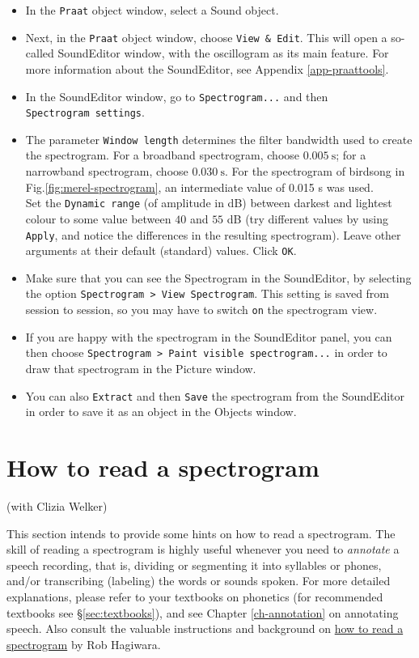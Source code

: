 \documentclass[
]{book}
\begin{document}
\begin{itemize}
\item
  In the \texttt{Praat} object window, select a Sound object.
\item
  Next, in the \texttt{Praat} object window, choose \texttt{View\ \&\ Edit}. This will open a so-called SoundEditor window, with the oscillogram as its main feature. For more information about the SoundEditor, see Appendix \ref{app-praattools}.
\item
  In the SoundEditor window, go to \texttt{Spectrogram...} and then \texttt{Spectrogram\ settings}.
\item
  The parameter \texttt{Window\ length} determines the filter bandwidth used to create the spectrogram. For a broadband spectrogram, choose \(0.005\ \textrm{s}\); for a narrowband spectrogram, choose \(0.030\ \textrm{s}\).
  For the spectrogram of birdsong in Fig.\ref{fig:merel-spectrogram}, an intermediate value of 0.015 s was used.\\
  Set the \texttt{Dynamic\ range} (of amplitude in dB) between darkest and lightest colour to some value between \(40\) and \(55\) dB (try different values by using \texttt{Apply}, and notice the differences in the resulting spectrogram).
  Leave other arguments at their default (standard) values. Click \texttt{OK}.
\item
  Make sure that you can see the Spectrogram in the SoundEditor, by selecting the option \texttt{Spectrogram\ \textgreater{}\ View\ Spectrogram}. This setting is saved from session to session, so you may have to switch \texttt{on} the spectrogram view.
\item
  If you are happy with the spectrogram in the SoundEditor panel, you can then choose \texttt{Spectrogram\ \textgreater{}\ Paint\ visible\ spectrogram...} in order to draw that spectrogram in the Picture window.
\item
  You can also \texttt{Extract} and then \texttt{Save} the spectrogram from the SoundEditor in order to save it as an object in the Objects window.
\end{itemize}

\section{How to read a spectrogram}\label{sec:readspectrogram}

(with Clizia Welker)

\protect{}\label{box-spectrogram}
This section intends to provide some hints on how to read a spectrogram. The skill of reading a spectrogram is highly useful whenever you need to \emph{annotate} a speech recording, that is, dividing or segmenting it into syllables or phones, and/or transcribing (labeling) the words or sounds spoken. For more detailed explanations, please refer to your textbooks on phonetics (for recommended textbooks see §\ref{sec:textbooks}), and see Chapter \ref{ch-annotation} on annotating speech. Also consult the valuable instructions and background on \href{https://home.cc.umanitoba.ca/~robh/howto.html}{how to read a spectrogram} by Rob Hagiwara.
\end{document}
